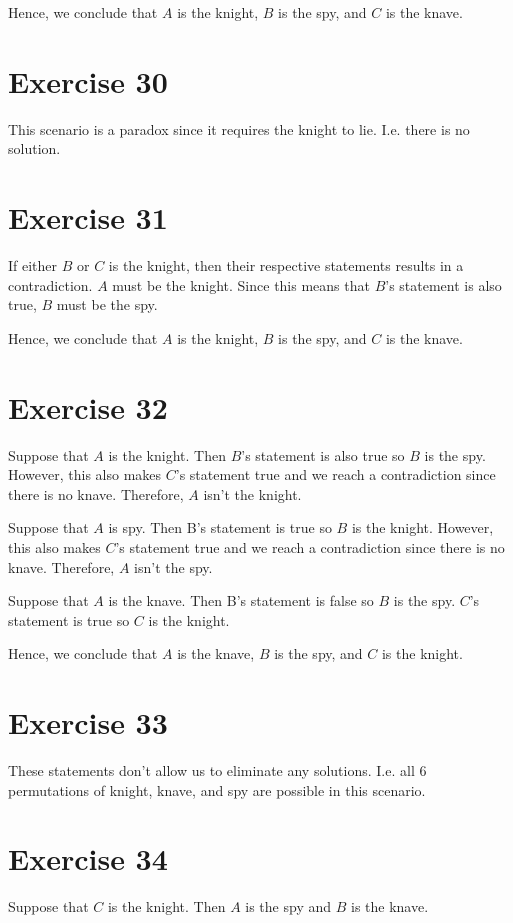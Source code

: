 \documentclass{article}
\begin{document}
Hence, we conclude that $A$ is the knight, $B$ is the spy, and $C$ is the knave.

\pagebreak

\section{Exercise 30}
This scenario is a paradox since it requires the knight to lie. I.e. there is no solution.

\pagebreak

\section{Exercise 31}
If either $B$ or $C$ is the knight, then their respective statements results in a contradiction. $A$ must be the knight. Since this means that $B$'s statement is also true, $B$ must be the spy.

Hence, we conclude that $A$ is the knight, $B$ is the spy, and $C$ is the knave.

\pagebreak

\section{Exercise 32}
Suppose that $A$ is the knight. Then $B$'s statement is also true so $B$ is the spy. However, this also makes $C$'s statement true and we reach a contradiction since there is no knave. Therefore, $A$ isn't the knight.

Suppose that $A$ is spy. Then B's statement is true so $B$ is the knight. However, this also makes $C$'s statement true and we reach a contradiction since there is no knave. Therefore, $A$ isn't the spy.

Suppose that $A$ is the knave. Then B's statement is false so $B$ is the spy. $C$'s statement is true so $C$ is the knight.

Hence, we conclude that $A$ is the knave, $B$ is the spy, and $C$ is the knight.

\pagebreak

\section{Exercise 33}
These statements don't allow us to eliminate any solutions. I.e. all 6 permutations of knight, knave, and spy are possible in this scenario.

\pagebreak

\section{Exercise 34}
Suppose that $C$ is the knight. Then $A$ is the spy and $B$ is the knave.
\end{document}
